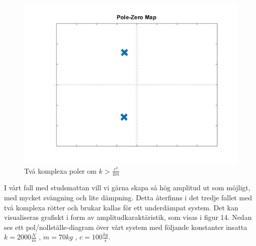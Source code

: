 \documentclass[10pt,a4paper]{article}
\begin{document}
\begin{figure}
\begin{center}
\includegraphics[scale=0.3]{2komplexa}
\caption{Två komplexa poler om $k>\frac{c^2}{4m}$}
\end{center}
\end{figure}
\newpage


I vårt fall med studsmattan vill vi gärna skapa så hög amplitud ut som möjligt, med mycket svängning och lite dämpning. Detta återfinns i det tredje fallet med två komplexa rötter och brukar kallas för ett underdämpat system. Det kan visualiseras grafiskt i form av amplitudkaraktäristik, som visas i figur 14. Nedan ses ett pol/nollställe-diagram över vårt system med följande konstanter insatta $k=2000\frac{N}{m}$ , $m=70kg$ , $c=100\frac{kg}{s}$.
\end{document}
